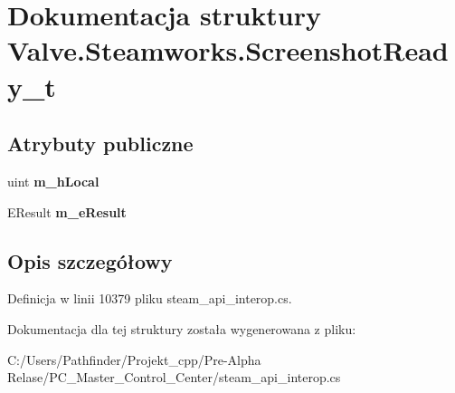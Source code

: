 \hypertarget{struct_valve_1_1_steamworks_1_1_screenshot_ready__t}{}\section{Dokumentacja struktury Valve.\+Steamworks.\+Screenshot\+Ready\+\_\+t}
\label{struct_valve_1_1_steamworks_1_1_screenshot_ready__t}
\subsection*{Atrybuty publiczne}
\begin{DoxyCompactItemize}
\item 
\mbox{\label{struct_valve_1_1_steamworks_1_1_screenshot_ready__t_a670119807c19cb0f77c49e528b7a6b8b}} 
uint {\bfseries m\+\_\+h\+Local}
\item 
\mbox{\label{struct_valve_1_1_steamworks_1_1_screenshot_ready__t_a86ee99da9a681f2072b515bd138a8f84}} 
E\+Result {\bfseries m\+\_\+e\+Result}
\end{DoxyCompactItemize}


\subsection{Opis szczegółowy}


Definicja w linii 10379 pliku steam\+\_\+api\+\_\+interop.\+cs.



Dokumentacja dla tej struktury została wygenerowana z pliku\+:\begin{DoxyCompactItemize}
\item 
C\+:/\+Users/\+Pathfinder/\+Projekt\+\_\+cpp/\+Pre-\/\+Alpha Relase/\+P\+C\+\_\+\+Master\+\_\+\+Control\+\_\+\+Center/steam\+\_\+api\+\_\+interop.\+cs\end{DoxyCompactItemize}
